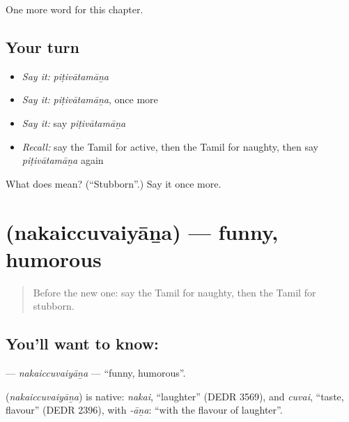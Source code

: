 \begin{grammarlens}[title={What you've built}]
One more word for this chapter.
\end{grammarlens}

\subsection*{Your turn}
\begin{itemize}
\raggedright
  \item \emph{Say it:} \emph{piṭivātamāṉa}
  \item \emph{Say it:} \emph{piṭivātamāṉa}, once more
  \item \emph{Say it:} say \emph{piṭivātamāṉa}
  \item \emph{Recall:} say the Tamil for active, then the Tamil for naughty, then say \emph{piṭivātamāṉa} again
\end{itemize}

\begin{tcolorbox}[breakable,colback=teal!4,colframe=teal!35!black,title={Before you move on}]
What does  mean? (\textquotedblleft{}Stubborn\textquotedblright{}.) Say it once more.
\end{tcolorbox}
\section[\texorpdfstring{\ta{நகைச்சுவையான} (nakaiccuvaiyāṉa)}{நகைச்சுவையான (nakaiccuvaiyāṉa)}]{ (nakaiccuvaiyāṉa) — funny, humorous}

\label{lesson:TA-C180-nakaiccuvaiyana}



\begin{quote}
Before the new one: say the Tamil for naughty, then the Tamil for stubborn.
\end{quote}

\subsection*{You'll want to know: }
\textbf{} — \emph{nakaiccuvaiyāṉa} — \textquotedblleft{}funny, humorous\textquotedblright{}.

\begin{cousinweb}
\textbf{} (\emph{nakaiccuvaiyāṉa}) is native: \emph{nakai}, \textquotedblleft{}laughter\textquotedblright{} (DEDR 3569), and \emph{cuvai}, \textquotedblleft{}taste, flavour\textquotedblright{} (DEDR 2396), with \emph{-āṉa}: \textquotedblleft{}with the flavour of laughter\textquotedblright{}.
\end{cousinweb}

